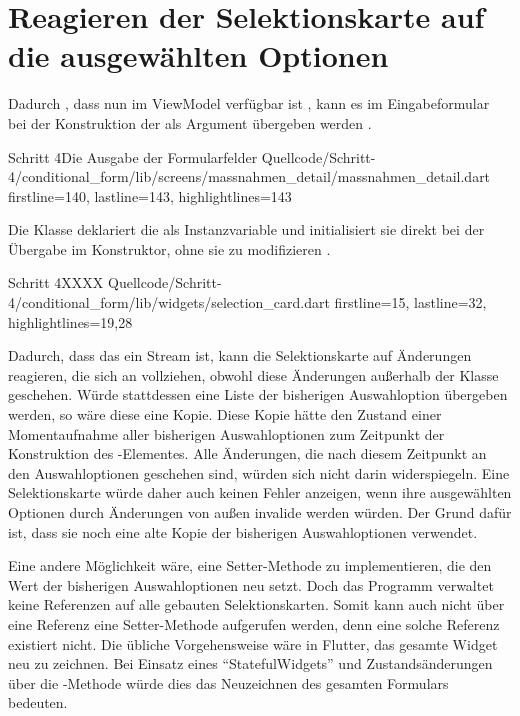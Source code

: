 \section{Reagieren der Selektionskarte auf die ausgewählten Optionen}

Dadurch
, dass  nun im ViewModel verfügbar ist
, kann es im Eingabeformular bei der Konstruktion der  als Argument übergeben werden .

\begin{alexlisting}{Schritt 4}{Die Ausgabe der Formularfelder}
  {Quellcode/Schritt-4/conditional_form/lib/screens/massnahmen_detail/massnahmen_detail.dart}
  {firstline=140, lastline=143, highlightlines={143}}
  \label{lst:Schritt4builderSelectionCard}
\end{alexlisting}

Die Klasse  deklariert die  als Instanzvariable  und initialisiert sie direkt bei der Übergabe im Konstruktor, ohne sie zu modifizieren .

\begin{alexlisting}{Schritt 4}{XXXX}
  {Quellcode/Schritt-4/conditional_form/lib/widgets/selection_card.dart}
  {firstline=15, lastline=32, highlightlines={19,28}}
  \label{lst:Schritt4SelectionCardPriorChoices}
\end{alexlisting} 


Dadurch, dass das  ein Stream ist,
kann die Selektionskarte auf Änderungen reagieren,
die sich an  vollziehen,
obwohl diese Änderungen außerhalb der Klasse geschehen.
Würde stattdessen eine Liste der bisherigen Auswahloption übergeben werden,
so wäre diese eine Kopie.
Diese Kopie hätte den Zustand einer Momentaufnahme aller bisherigen Auswahloptionen zum Zeitpunkt der Konstruktion des -Elementes.
Alle Änderungen,
die nach diesem Zeitpunkt an den Auswahloptionen geschehen sind,
würden sich nicht darin widerspiegeln.
Eine Selektionskarte würde daher auch keinen Fehler anzeigen,
wenn ihre ausgewählten Optionen durch Änderungen von außen invalide werden würden.
Der Grund dafür ist,
dass sie noch eine alte Kopie der bisherigen Auswahloptionen verwendet.

Eine andere Möglichkeit wäre,
eine Setter-Methode zu implementieren,
die den Wert der bisherigen Auswahloptionen neu setzt.
Doch das Programm verwaltet keine Referenzen auf alle gebauten Selektionskarten.
Somit kann auch nicht über eine Referenz eine Setter-Methode aufgerufen werden,
denn eine solche Referenz existiert nicht. 
Die übliche Vorgehensweise wäre in Flutter, das gesamte Widget neu zu zeichnen.
Bei Einsatz eines \enquote{StatefulWidgets} und Zustandsänderungen über die -Methode würde dies das Neuzeichnen des gesamten Formulars bedeuten.

